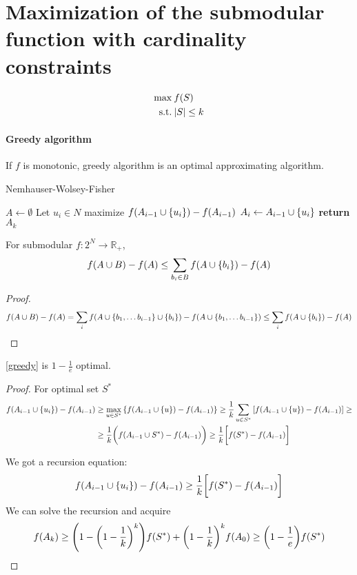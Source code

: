 \section{Maximization of the submodular function with cardinality constraints}
\begin{align}
\max \: & f(S)\\
\text{s.t.} \: & \abs{S} \leq k
\end{align}

\paragraph{Greedy algorithm}
If $f$ is monotonic, greedy algorithm is an optimal approximating algorithm.
\begin{algorithm}
	\caption{Nemhauser-Wolsey-Fisher}\label{greedy}
	\begin{algorithmic}[1]
		\State $A \gets \emptyset$
		\State Let $u_i\in N$ maximize $f(A_{i-1} \cup \qty{u_i}) - f(A_{i-1})$
		\State $ A_i \gets A_{i-1} \cup \qty{u_i}$
		\EndFor
		\State \textbf{return} $A_k$
		\EndProcedure
	\end{algorithmic}
\end{algorithm}
\begin{lemma}
	For submodular $f: 2^N \to \mathbb{R}_+$,
	\begin{align}
	f(A\cup B) - f(A) \leq \sum_{b_i \in B} f(A\cup \qty{b_i}) - f(A)
	\end{align}
	\begin{proof}
		\begin{align}
		f(A\cup B) - f(A) = \sum_i f(A \cup \qty{b_1, \dots b_{i-1}} \cup \qty{b_i} ) - f(A \cup \qty{b_1, \dots b_{i-1}})\leq \sum_i f(A \cup \qty{b_i}) - f(A)
		\end{align}
	\end{proof}
\end{lemma}
\begin{prop} \label{greedy_proof}
	\cref{greedy} is $1-\frac{1}{e}$ optimal.
	\begin{proof}
		For optimal set $S^*$
		\begin{align}
		f(A_{i-1} \cup \qty{u_i}) - f(A_{i-1})&\geq \max\limits_{u\in S^*} \qty{f(A_{i-1} \cup \qty{u}) - f(A_{i-1})} \geq \frac{1}{k} \sum_{u\in S^*} \qty[f(A_{i-1} \cup \qty{u}) - f(A_{i-1})] \geq\\&\geq \frac{1}{k} \qty\bigg(f(A_{i-1} \cup S^*) - f(A_{i-1})) \geq \frac{1}{k} \qty\bigg[f(S^*) - f(A_{i-1})]
		\end{align}
		
		We got a recursion equation:
		\begin{align}
		f(A_{i-1} \cup \qty{u_i}) - f(A_{i-1})\geq \frac{1}{k} \qty\bigg[f(S^*) - f(A_{i-1})]
		\end{align}
		We can solve the recursion and acquire
		\begin{align}
		f(A_{k}) \geq \qty(1-\qty(1-\frac{1}{k})^k)f(S^*) + \qty(1-\frac{1}{k})^k f(A_0) \geq \qty(1-\frac{1}{e}) f(S^*) 
		\end{align}
		
	\end{proof}
\end{prop}

